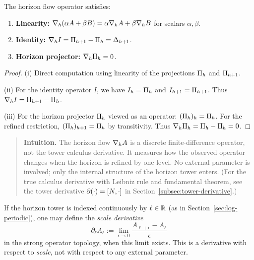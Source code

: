 \begin{proposition}
\label{prop:horizon-flow-linear}
The horizon flow operator satisfies:
\begin{enumerate}[label=(\roman*)]
\item \textbf{Linearity:} $\CCFlow{(\alpha A + \beta B)}{h} = \alpha \CCFlow{A}{h} + \beta \CCFlow{B}{h}$ for scalars $\alpha, \beta$.
\item \textbf{Identity:} $\CCFlow{I}{h} = \CCPi{h+1} - \CCPi{h} = \CCDelta{h+1}$.
\item \textbf{Horizon projector:} $\CCFlow{\CCPi{h}}{h} = 0$.
\end{enumerate}
\end{proposition}

\begin{proof}
(i) Direct computation using linearity of the projections $\CCPi{h}$ and $\CCPi{h+1}$.

(ii) For the identity operator $I$, we have $\CCObs{I}{h} = \CCPi{h}$ and $\CCObs{I}{h+1} = \CCPi{h+1}$.
Thus $\CCFlow{I}{h} = \CCPi{h+1} - \CCPi{h}$.

(iii) For the horizon projector $\CCPi{h}$ viewed as an operator: $\CCObs{(\CCPi{h})}{h} = \CCPi{h}$.
For the refined restriction, $\CCObs{(\CCPi{h})}{h+1} = \CCPi{h}$ by transitivity.
Thus $\CCFlow{\CCPi{h}}{h} = \CCPi{h} - \CCPi{h} = 0$.
\end{proof}

\begin{quote}\small
\textbf{Intuition.}
The horizon flow $\CCFlow{A}{h}$ is a discrete finite-difference operator, not
the tower calculus derivative.
It measures how the observed operator changes when the horizon is refined by one level.
No external parameter is involved; only the internal structure of the horizon
tower enters.
(For the true calculus derivative with Leibniz rule and fundamental theorem, see the tower derivative $\CCDer{\cdot} = [\CCIndexOp, \cdot]$ in Section~\ref{subsec:tower-derivative}.)
\end{quote}

\begin{remark}
If the horizon tower is indexed continuously by $\ell \in \bbR$ (as in Section~\ref{sec:log-periodic}), one may define the \emph{scale derivative}
\[
\partial_\ell A_\ell := \lim_{\epsilon \to 0} \frac{A_{\ell+\epsilon} - A_\ell}{\epsilon}
\]
in the strong operator topology, when this limit exists.
This is a derivative with respect to \emph{scale}, not with respect to any external parameter.
\end{remark}

